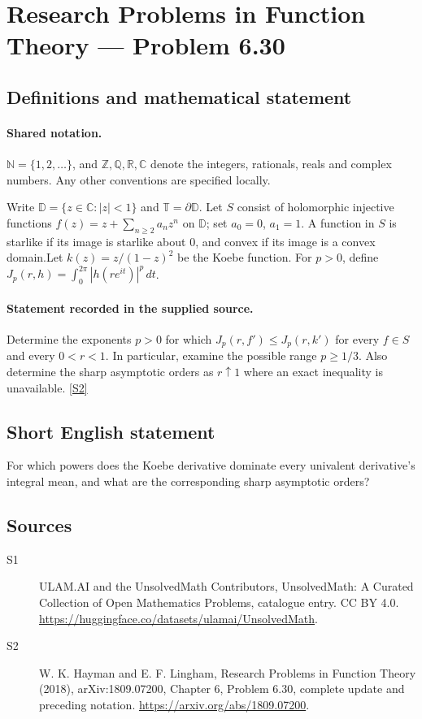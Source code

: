 \documentclass[11pt]{article}
\newcommand{\sref}[2]{\hyperlink{source:#1:#2}{[S#2]}}
\begin{document}
\section{Research Problems in Function Theory — Problem 6.30}\label{statement}

\subsection{Definitions and mathematical statement}

\paragraph{Shared notation.}$\mathbb N=\{1,2,\ldots\}$, and $\mathbb Z,\mathbb Q,\mathbb R,\mathbb C$ denote the integers, rationals, reals and complex numbers. Any other conventions are specified locally.


Write $\mathbb D=\{z\in\mathbb C:|z|<1\}$ and $\mathbb T=\partial\mathbb D$. Let $S$ consist of holomorphic injective functions $f(z)=z+\sum_{n\ge2}a_nz^n$ on $\mathbb D$; set $a_0=0$, $a_1=1$. A function in $S$ is starlike if its image is starlike about $0$, and convex if its image is a convex domain.Let $k(z)=z/(1-z)^2$ be the Koebe function. For $p>0$, define $J_p(r,h)=\int_0^{2\pi}|h(re^{it})|^p\,dt$.
\paragraph{Statement recorded in the supplied source.}
Determine the exponents $p>0$ for which $J_p(r,f')\le J_p(r,k')$ for every $f\in S$ and every $0<r<1$. In particular, examine the possible range $p\ge1/3$. Also determine the sharp asymptotic orders as $r\uparrow1$ where an exact inequality is unavailable. \sref{statement}{2}
\subsection{Short English statement}
For which powers does the Koebe derivative dominate every univalent derivative’s integral mean, and what are the corresponding sharp asymptotic orders?
\subsection{Sources}
\begin{description}
\item[\hypertarget{source:statement:1}{S1}] ULAM.AI and the UnsolvedMath Contributors, UnsolvedMath: A Curated Collection of Open Mathematics Problems, catalogue entry. CC BY 4.0. \url{https://huggingface.co/datasets/ulamai/UnsolvedMath}.
\item[\hypertarget{source:statement:2}{S2}] W. K. Hayman and E. F. Lingham, Research Problems in Function Theory (2018), arXiv:1809.07200, Chapter 6, Problem 6.30, complete update and preceding notation. \url{https://arxiv.org/abs/1809.07200}.
\end{description}
\label{end:statement}
\end{document}
